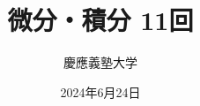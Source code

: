 \documentclass[dvipdfmx,cjk,10.2pt]{beamer}
\theoremstyle{definition}
\begin{document}
\title{微分・積分 11回} 
\author{慶應義塾大学}            %
\date{2024年6月24日}
\maketitle
















\end{document}
